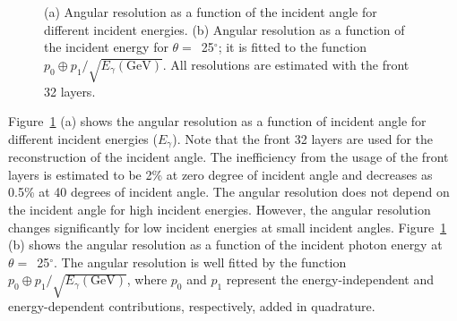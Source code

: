 \documentclass[12pt,times,draftclsnofoot,a4paper]{elsarticle}
\begin{document}
\begin{figure}[!hbt]
\centering
{}
\caption{ (a) Angular resolution as a function of the incident angle for different incident energies. (b) Angular resolution as a function of the incident energy for $\theta=$~25$^{\circ}$; it is fitted to the function $p_{0} \oplus p_{1}/\sqrt{E_{\gamma}(\mathrm{GeV})}$. All resolutions are estimated with the front 32 layers. }
\label{fig:angle_reco_dep_gr}
\end{figure}

Figure~\ref{fig:angle_reco_dep_gr} (a) shows the angular resolution as a function of incident angle for different incident energies ($E_{\gamma}$). Note that the front 32 layers are used for the reconstruction of the incident angle. The inefficiency from the usage of the front layers is estimated to be 2\% at zero degree of incident angle and decreases as 0.5\% at 40 degrees of incident angle. The angular resolution does not depend on the incident angle for high incident energies. However, the angular resolution changes significantly for low incident energies at small incident angles. Figure~\ref{fig:angle_reco_dep_gr} (b) shows the angular resolution as a function of the incident photon energy at $\theta=$~25$^{\circ}$. The angular resolution is well fitted by the function $p_{0} \oplus p_{1}/\sqrt{E_{\gamma}(\mathrm{GeV})}$, where $p_{0}$ and $p_{1}$ represent the energy-independent and energy-dependent contributions, respectively, added in quadrature.
\end{document}
